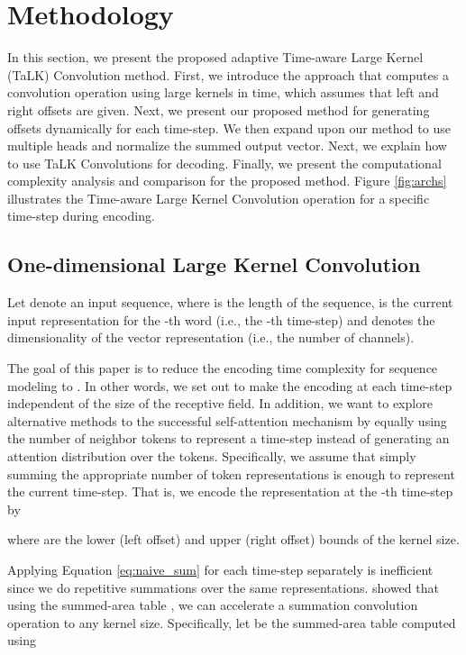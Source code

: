 \documentclass{article}
\def\talkfull{Time-aware Large Kernel Convolution}
\begin{document}
\section{Methodology}
In this section, we present the proposed adaptive Time-aware Large Kernel (TaLK) Convolution method. First, we introduce the approach that computes a convolution operation using large kernels in  time, which assumes that left and right offsets are given. Next, we present our proposed method for generating offsets dynamically for each time-step. We then expand upon our method to use multiple heads and normalize the summed output vector. Next, we explain how to use TaLK Convolutions for decoding. Finally, we present the computational complexity analysis and comparison for the proposed method. Figure \ref{fig:archs} illustrates the {\talkfull} operation for a specific time-step during encoding.


\subsection{One-dimensional Large Kernel Convolution}
\label{sec:lkc}

Let  denote an input sequence, where  is the length of the sequence,  is the current input representation for the -th word (i.e., the -th time-step) and  denotes the dimensionality of the vector representation (i.e., the number of channels).

The goal of this paper is to reduce the encoding time complexity for sequence modeling to . In other words, we set out to make the encoding at each time-step independent of the size of the receptive field. 
In addition, we want to explore alternative methods to the successful self-attention mechanism by equally using the number of neighbor tokens to represent a time-step instead of generating an attention distribution over the tokens. Specifically, we assume that simply summing the appropriate number of token representations is enough to represent the current time-step. That is, we encode the representation at the -th time-step by

where  are the lower (left offset) and upper (right offset) bounds of the kernel size.

Applying Equation \ref{eq:naive_sum} for each time-step  separately is inefficient since we do repetitive summations over the same representations. \citet{zhang2019accelerating} showed that using the summed-area table \cite{crow1984summed}, we can accelerate a summation convolution operation to any kernel size. Specifically, let  be the summed-area table computed using
\end{document}
